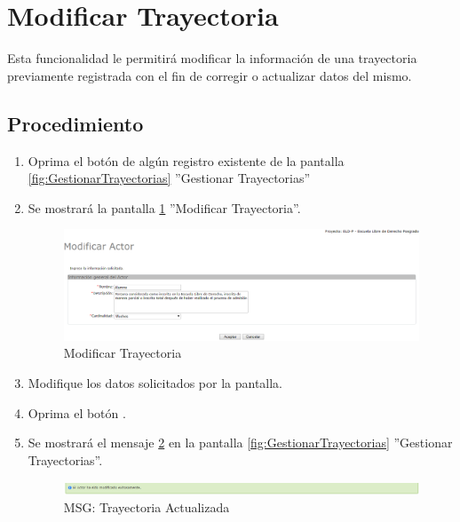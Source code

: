 \hypertarget{cv:modificarTray}{\section{Modificar Trayectoria}} \label{sec:modificarTray}

	Esta funcionalidad le permitirá modificar la información de una trayectoria previamente registrada con el fin de corregir o actualizar datos del mismo. 

		\subsection{Procedimiento}

			\begin{enumerate}
	
			\item Oprima el botón \IUEditar{} de algún registro existente de la pantalla \ref{fig:GestionarTrayectorias} ''Gestionar Trayectorias''
	
			\item Se mostrará la pantalla \ref{fig:modificarTray} ''Modificar Trayectoria''.
			
			\begin{figure}[htbp!]
				\begin{center}
					\includegraphics[scale=0.5]{roles/lider/actor/pantallas/IU10-2modificarActor}
					\caption{Modificar Trayectoria}
					\label{fig:modificarTray}
				\end{center}
			\end{figure}
		
			\item Modifique los datos solicitados por la pantalla.
						
			\item Oprima el botón \IUAceptar.
			
			\item Se mostrará el mensaje \ref{fig:TrayModificada} en la pantalla \ref{fig:GestionarTrayectorias} ''Gestionar Trayectorias''.
			
			\begin{figure}[htbp!]
				\begin{center}
					\includegraphics[scale=0.5]{roles/lider/actor/pantallas/IU10-2MSG1}
					\caption{MSG: Trayectoria Actualizada}
					\label{fig:TrayModificada}
				\end{center}
			\end{figure}
			\end{enumerate}